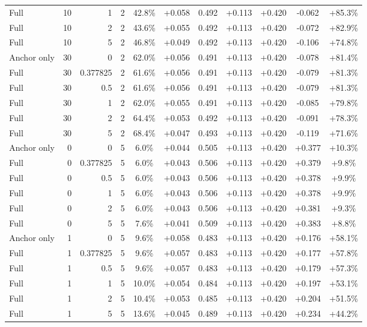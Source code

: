 \begin{table}[htbp]
\begin{tabular}{lrrrccccccc}
Full & 10 & 1 & 2 & 42.8\% & +0.058 & 0.492 & +0.113 & +0.420 & -0.062 & +85.3\% \\
Full & 10 & 2 & 2 & 43.6\% & +0.055 & 0.492 & +0.113 & +0.420 & -0.072 & +82.9\% \\
Full & 10 & 5 & 2 & 46.8\% & +0.049 & 0.492 & +0.113 & +0.420 & -0.106 & +74.8\% \\
Anchor only & 30 & 0 & 2 & 62.0\% & +0.056 & 0.491 & +0.113 & +0.420 & -0.078 & +81.4\% \\
Full & 30 & 0.377825 & 2 & 61.6\% & +0.056 & 0.491 & +0.113 & +0.420 & -0.079 & +81.3\% \\
Full & 30 & 0.5 & 2 & 61.6\% & +0.056 & 0.491 & +0.113 & +0.420 & -0.079 & +81.3\% \\
Full & 30 & 1 & 2 & 62.0\% & +0.055 & 0.491 & +0.113 & +0.420 & -0.085 & +79.8\% \\
Full & 30 & 2 & 2 & 64.4\% & +0.053 & 0.492 & +0.113 & +0.420 & -0.091 & +78.3\% \\
Full & 30 & 5 & 2 & 68.4\% & +0.047 & 0.493 & +0.113 & +0.420 & -0.119 & +71.6\% \\
Anchor only & 0 & 0 & 5 & 6.0\% & +0.044 & 0.505 & +0.113 & +0.420 & +0.377 & +10.3\% \\
Full & 0 & 0.377825 & 5 & 6.0\% & +0.043 & 0.506 & +0.113 & +0.420 & +0.379 & +9.8\% \\
Full & 0 & 0.5 & 5 & 6.0\% & +0.043 & 0.506 & +0.113 & +0.420 & +0.378 & +9.9\% \\
Full & 0 & 1 & 5 & 6.0\% & +0.043 & 0.506 & +0.113 & +0.420 & +0.378 & +9.9\% \\
Full & 0 & 2 & 5 & 6.0\% & +0.043 & 0.506 & +0.113 & +0.420 & +0.381 & +9.3\% \\
Full & 0 & 5 & 5 & 7.6\% & +0.041 & 0.509 & +0.113 & +0.420 & +0.383 & +8.8\% \\
Anchor only & 1 & 0 & 5 & 9.6\% & +0.058 & 0.483 & +0.113 & +0.420 & +0.176 & +58.1\% \\
Full & 1 & 0.377825 & 5 & 9.6\% & +0.057 & 0.483 & +0.113 & +0.420 & +0.177 & +57.8\% \\
Full & 1 & 0.5 & 5 & 9.6\% & +0.057 & 0.483 & +0.113 & +0.420 & +0.179 & +57.3\% \\
Full & 1 & 1 & 5 & 10.0\% & +0.054 & 0.484 & +0.113 & +0.420 & +0.197 & +53.1\% \\
Full & 1 & 2 & 5 & 10.4\% & +0.053 & 0.485 & +0.113 & +0.420 & +0.204 & +51.5\% \\
Full & 1 & 5 & 5 & 13.6\% & +0.045 & 0.489 & +0.113 & +0.420 & +0.234 & +44.2\% \\

\end{tabular}
\end{table}
